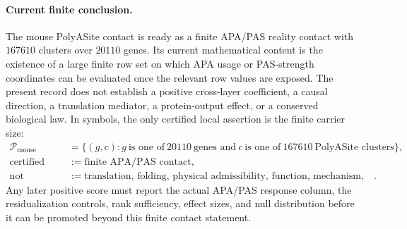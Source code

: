 \paragraph{Current finite conclusion.}
The mouse PolyASite contact is ready as a finite APA/PAS reality contact with $167610$ clusters over $20110$ genes.  Its current mathematical content is the existence of a large finite row set on which APA usage or PAS-strength coordinates can be evaluated once the relevant row values are exposed.  The present record does not establish a positive cross-layer coefficient, a causal direction, a translation mediator, a protein-output effect, or a conserved biological law.  In symbols, the only certified local assertion is the finite carrier size:
$$
\begin{aligned}
  \mathcal{P}_{\mathrm{mouse}} &= \{(g,c): g\ \text{is one of}\ 20110\ \text{genes and}\ c\ \text{is one of}\ 167610\ \text{PolyASite clusters}\},\\
  \text{certified here} &:= \text{finite APA/PAS contact},\\
  \text{not certified here} &:= \text{translation, folding, physical admissibility, function, mechanism, or universality}.
\end{aligned}
$$
Any later positive score must report the actual APA/PAS response column, the residualization controls, rank sufficiency, effect sizes, and null distribution before it can be promoted beyond this finite contact statement.